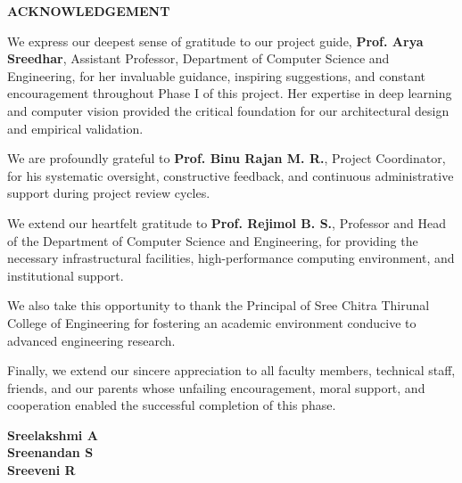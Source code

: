 \newpage
\thispagestyle{empty}

\begin{center}
\textbf{\Large ACKNOWLEDGEMENT}
\end{center}

\vspace{0.8cm}

\noindent
We express our deepest sense of gratitude to our project guide, \textbf{Prof. Arya Sreedhar}, Assistant Professor, Department of Computer Science and Engineering, for her invaluable guidance, inspiring suggestions, and constant encouragement throughout Phase I of this project. Her expertise in deep learning and computer vision provided the critical foundation for our architectural design and empirical validation.

\vspace{0.5cm}
\noindent
We are profoundly grateful to \textbf{Prof. Binu Rajan M. R.}, Project Coordinator, for his systematic oversight, constructive feedback, and continuous administrative support during project review cycles.

\vspace{0.5cm}
\noindent
We extend our heartfelt gratitude to \textbf{Prof. Rejimol B. S.}, Professor and Head of the Department of Computer Science and Engineering, for providing the necessary infrastructural facilities, high-performance computing environment, and institutional support.

\vspace{0.5cm}
\noindent
We also take this opportunity to thank the Principal of Sree Chitra Thirunal College of Engineering for fostering an academic environment conducive to advanced engineering research.

\vspace{0.5cm}
\noindent
Finally, we extend our sincere appreciation to all faculty members, technical staff, friends, and our parents whose unfailing encouragement, moral support, and cooperation enabled the successful completion of this phase.

\vspace{1.5cm}

\noindent
\begin{flushright}
\textbf{Sreelakshmi A}\\
\textbf{Sreenandan S}\\
\textbf{Sreeveni R}\\
\end{flushright}
